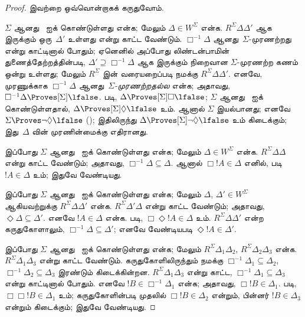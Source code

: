 \documentclass[../../../include/open-logic-section]{subfiles}
\begin{document}
\begin{proof}
  இவற்றை ஒவ்வொன்றாகக் கருதுவோம்.

  $\Sigma$ ஆனது~ ஐக் கொண்டுள்ளது என்க; மேலும் $\Delta \in W^\Sigma$
  என்க. $R^\Sigma \Delta\Delta'$ ஆக இருக்கும் ஒரு~$\Delta'$ உள்ளது என்று
  காட்ட வேண்டும். $\Box^{-1}\Delta$ ஆனது~$\Sigma$-முரணற்றது என்று காட்டினால்
  போதும்; ஏனெனில் அப்போது லிண்டன்பாமின் துணைத்தேற்றத்தின்படி,
  $\Delta' \supseteq \Box^{-1}\Delta$ ஆக இருக்கும் நிறைவான
  $\Sigma$-முரணற்ற கணம் ஒன்று உள்ளது; மேலும் $R^\Sigma$ இன்
  வரையறைப்படி நமக்கு $R^\Sigma \Delta\Delta'$.
  எனவே, முரணுக்காக $\Box^{-1}\Delta$ ஆனது~\emph{$\Sigma$-முரணற்றதல்ல}
  என்க; அதாவது, $\Box^{-1}\Delta \Proves[\Sigma] \lfalse$.
   படி, $\Delta \Proves[\Sigma] \Box\lfalse$;
  $\Sigma$ ஆனது~ ஐக் கொண்டுள்ளதால், $\Delta \Proves[\Sigma]
  \Diamond\lfalse$ உம். ஆனால் $\Sigma$ இயல்பானது; எனவே
  $\Sigma \Proves \lnot\Diamond \lfalse$
  (); இதிலிருந்து $\Delta
  \Proves[\Sigma] \lnot\Diamond \lfalse$ உம் கிடைக்கும்; இது~$\Delta$
  வின் முரணின்மைக்கு எதிரானது.

  இப்போது $\Sigma$ ஆனது~ ஐக் கொண்டுள்ளது என்க; மேலும் $\Delta \in
  W^\Sigma$ என்க. $R^\Sigma \Delta\Delta$ என்று காட்ட வேண்டும்;
  அதாவது,
  $\Box^{-1}\Delta \subseteq \Delta$. ஆனால் $\Box!A \in \Delta$ எனில்,
   படி $!A \in \Delta$ உம்; இதுவே வேண்டியது.

  இப்போது $\Sigma$ ஆனது~ ஐக் கொண்டுள்ளது என்க; மேலும் $\Delta$,
  $\Delta' \in W^\Sigma$ ஆகியவற்றுக்கு $R^\Sigma \Delta\Delta'$ என்க.
  $R^\Sigma \Delta'\Delta$ என்று காட்ட வேண்டும்; அதாவது,
  $\Diamond\Delta \subseteq \Delta'$. எனவே $!A \in \Delta$ என்க.
   படி, $\Box\Diamond!A \in \Delta$ உம். $R^\Sigma
  \Delta\Delta'$ என்ற கருதுகோளாலும், $\Box^{-1}\Delta
  \subseteq \Delta'$; எனவே வேண்டியபடி $\Diamond!A \in \Delta'$.

  இப்போது $\Sigma$ ஆனது~ ஐக் கொண்டுள்ளது என்க; மேலும்
  $R^\Sigma \Delta_1\Delta_2$, $R^\Sigma \Delta_2\Delta_3$ என்க.
  $R^\Sigma \Delta_1\Delta_3$ என்று காட்ட வேண்டும். கருதுகோளிலிருந்தும்
   நமக்கு
  $\Box^{-1}\Delta_1 \subseteq \Delta_2$, $\Box^{-1}\Delta_2 \subseteq
  \Delta_3$ இரண்டும் கிடைக்கின்றன. $R^\Sigma \Delta_1\Delta_3$ என்று
  காட்ட, $\Box^{-1}\Delta_1 \subseteq \Delta_3$ என்று காட்டினால் போதும்.
  எனவே $!B \in \Box^{-1}\Delta_1$ என்க; அதாவது,
  $\Box!B \in \Delta_1$.  படி, $\Box\Box!B \in \Delta_1$ உம்;
  கருதுகோளின்படி முதலில் $\Box!B \in \Delta_2$ என்றும், பின்னர்
  $!B \in \Delta_3$ என்றும் கிடைக்கும்; இதுவே வேண்டியது.


\end{proof}
\end{document}

